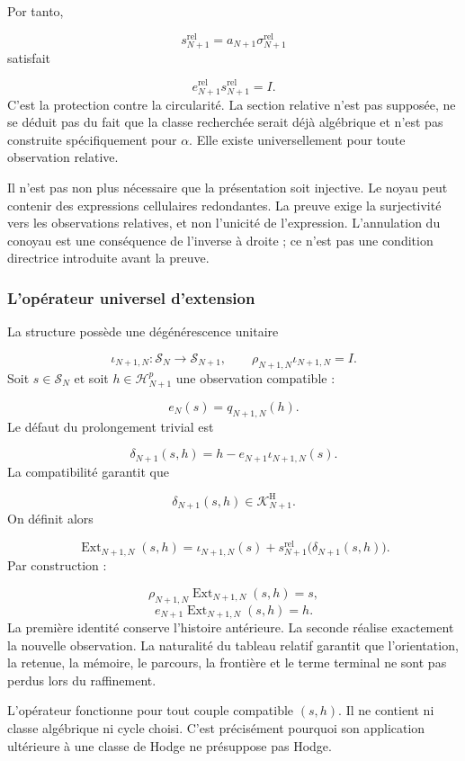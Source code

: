 Por tanto,\par
\[
s_{N+1}^{\mathrm{rel}}
=
a_{N+1}\sigma_{N+1}^{\mathrm{rel}}
\]
satisfait\par
\[
e_{N+1}^{\mathrm{rel}}
s_{N+1}^{\mathrm{rel}}
=I.
\]
C’est la protection contre la circularité. La section relative n’est pas supposée, ne se déduit pas du fait que la classe recherchée serait déjà algébrique et n’est pas construite spécifiquement pour \(\alpha\). Elle existe universellement pour toute observation relative.\par
Il n’est pas non plus nécessaire que la présentation soit injective. Le noyau peut contenir des expressions cellulaires redondantes. La preuve exige la surjectivité vers les observations relatives, et non l’unicité de l’expression. L’annulation du conoyau est une conséquence de l’inverse à droite ; ce n’est pas une condition directrice introduite avant la preuve.\par
{}
\subsubsection{L’opérateur universel d’extension}
La structure possède une dégénérescence unitaire\par
\[
\iota_{N+1,N}:\mathscr S_N\longrightarrow\mathscr S_{N+1},
\qquad
\rho_{N+1,N}\iota_{N+1,N}=I.
\]
Soit \(s\in\mathscr S_N\) et soit \(h\in\mathscr H_{N+1}^p\) une observation compatible :\par
\[
e_N(s)=q_{N+1,N}(h).
\]
Le défaut du prolongement trivial est\par
\[
\delta_{N+1}(s,h)
=
h-e_{N+1}\iota_{N+1,N}(s).
\]
La compatibilité garantit que\par
\[
\delta_{N+1}(s,h)
\in
\mathscr K_{N+1}^{\mathrm H}.
\]
On définit alors\par
\[
\operatorname{Ext}_{N+1,N}(s,h)
=
\iota_{N+1,N}(s)
+
s_{N+1}^{\mathrm{rel}}
\bigl(\delta_{N+1}(s,h)\bigr).
\]
Par construction :\par
\[
\rho_{N+1,N}
\operatorname{Ext}_{N+1,N}(s,h)
=s,
\]
\[
e_{N+1}
\operatorname{Ext}_{N+1,N}(s,h)
=h.
\]
La première identité conserve l’histoire antérieure. La seconde réalise exactement la nouvelle observation. La naturalité du tableau relatif garantit que l’orientation, la retenue, la mémoire, le parcours, la frontière et le terme terminal ne sont pas perdus lors du raffinement.\par
L’opérateur fonctionne pour tout couple compatible \((s,h)\). Il ne contient ni classe algébrique ni cycle choisi. C’est précisément pourquoi son application ultérieure à une classe de Hodge ne présuppose pas Hodge.\par
{}
